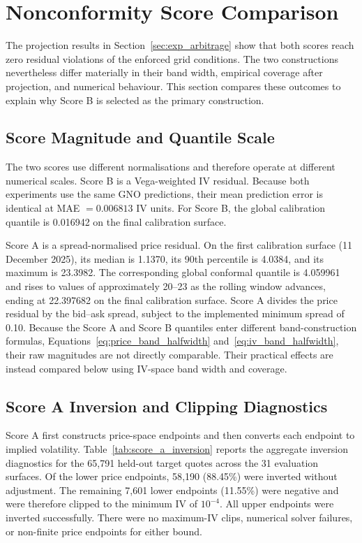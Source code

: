 \section{Nonconformity Score Comparison}
\label{sec:exp_ablation}

The projection results in Section~\ref{sec:exp_arbitrage} show that both scores reach zero residual violations of the enforced grid conditions. The two constructions nevertheless differ materially in their band width, empirical coverage after projection, and numerical behaviour. This section compares these outcomes to explain why Score B is selected as the primary construction.

\subsection{Score Magnitude and Quantile Scale}
\label{subsec:ablation_magnitude}

The two scores use different normalisations and therefore operate at different numerical scales. Score B is a Vega-weighted IV residual. Because both experiments use the same GNO predictions, their mean prediction error is identical at MAE $=0.006813$ IV units. For Score B, the global calibration quantile is 0.016942 on the final calibration surface.

Score A is a spread-normalised price residual. On the first calibration surface (11 December 2025), its median is 1.1370, its 90th percentile is 4.0384, and its maximum is 23.3982. The corresponding global conformal quantile is 4.059961 and rises to values of approximately 20--23 as the rolling window advances, ending at 22.397682 on the final calibration surface. Score A divides the price residual by the bid--ask spread, subject to the implemented minimum spread of 0.10. Because the Score A and Score B quantiles enter different band-construction formulas, Equations~\ref{eq:price_band_halfwidth} and~\ref{eq:iv_band_halfwidth}, their raw magnitudes are not directly comparable. Their practical effects are instead compared below using IV-space band width and coverage.

\subsection{Score A Inversion and Clipping Diagnostics}
\label{subsec:score_a_diagnostics}

Score A first constructs price-space endpoints and then converts each endpoint to implied volatility. Table~\ref{tab:score_a_inversion} reports the aggregate inversion diagnostics for the 65{,}791 held-out target quotes across the 31 evaluation surfaces. Of the lower price endpoints, 58{,}190 (88.45\%) were inverted without adjustment. The remaining 7{,}601 lower endpoints (11.55\%) were negative and were therefore clipped to the minimum IV of $10^{-4}$. All upper endpoints were inverted successfully. There were no maximum-IV clips, numerical solver failures, or non-finite price endpoints for either bound.

